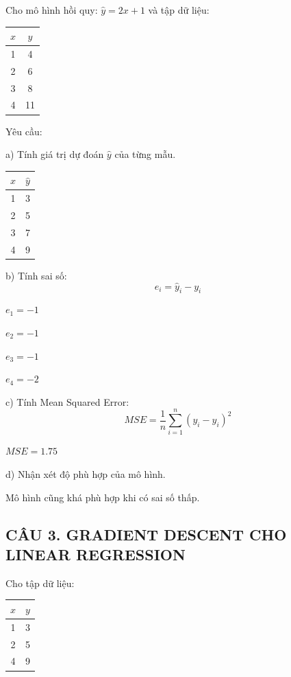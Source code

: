 \documentclass[a4paper,12pt]{article}
\begin{document}
Cho mô hình hồi quy: $\hat{y} = 2x + 1$ và tập dữ liệu:
\begin{center}
\begin{tabular}{|c|c|}
\hline
$x$ & $y$ \\
\hline
1 & 4 \\
2 & 6 \\
3 & 8 \\
4 & 11 \\
\hline
\end{tabular}
\end{center}

Yêu cầu:

a) Tính giá trị dự đoán $\hat{y}$ của từng mẫu.
\begin{center}
\begin{tabular}{|c|c|}
\hline
$x$ & $\hat{y}$ \\
\hline
1 & 3 \\
2 & 5 \\
3 & 7 \\
4 & 9 \\
\hline
\end{tabular}
\end{center}

b) Tính sai số:
\[ e_i = \hat{y}_i - y_i \]

$e_1 = -1$

$e_2 = -1$

$e_3 = -1$

$e_4 = -2$

c) Tính Mean Squared Error:
\[ MSE = \frac{1}{n}\sum_{i=1}^{n}(y_i - \hat{y}_i)^2 \]

$MSE = 1.75$

d) Nhận xét độ phù hợp của mô hình.

Mô hình cũng khá phù hợp khi có sai số thấp.

\subsection*{CÂU 3. GRADIENT DESCENT CHO LINEAR REGRESSION}

Cho tập dữ liệu:
\begin{center}
\begin{tabular}{|c|c|}
\hline
$x$ & $y$ \\
\hline
1 & 3 \\
2 & 5 \\
4 & 9 \\
\hline
\end{tabular}
\end{center}
\end{document}

